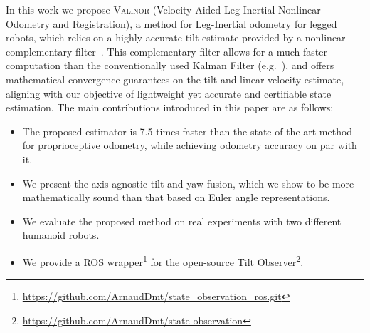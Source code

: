 \documentclass{IJCAS}
\begin{document}
In this work we propose {\scshape Valinor} (Velocity-Aided Leg Inertial Nonlinear Odometry and Registration), a method for Leg-Inertial odometry for legged robots, which relies on a highly accurate tilt estimate provided by a nonlinear complementary filter~\cite{benallegue2020LyapunovStableOrientationEstimatorHumanoids}. This complementary filter allows for a much faster computation than the conventionally used Kalman Filter (e.g.~\cite{Hartley2020RIEKF}), and offers mathematical convergence guarantees on the tilt and linear velocity estimate, aligning with our objective of lightweight yet accurate and certifiable state estimation.
The main contributions introduced in this paper are as follows:
\begin{itemize}[leftmargin=0pt]
  \item The proposed estimator is 7.5 times faster than the state-of-the-art method for proprioceptive odometry, while achieving odometry accuracy on par with it.
  \item We present the axis-agnostic tilt and yaw fusion, which we show to be more mathematically sound than that based on Euler angle representations.
  \item We evaluate the proposed method on real experiments with two different humanoid robots.
  \item We provide a ROS wrapper\footnote{\scriptsize \url{https://github.com/ArnaudDmt/state_observation_ros.git}} for the open-source Tilt Observer\footnote{\scriptsize \url{https://github.com/ArnaudDmt/state-observation}}.
\end{itemize}
\end{document}
